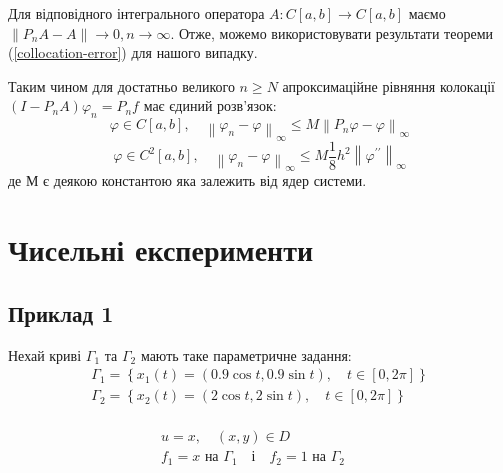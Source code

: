 \documentclass[14pt,a4paper]{extarticle}
\newcounter{e}
\numberwithin{equation}{section}
\numberwithin{figure}{section}
\begin{document}
 Для відповідного інтегрального оператора $A: C[a, b] \rightarrow C[a, b]$ маємо $\left\|P_{n} A-A\right\| \rightarrow 0, n \rightarrow \infty$.
 Отже, можемо використовувати результати теореми (\ref{collocation-error}) для нашого випадку.

 Таким чином для достатньо великого $n \geq N$ апроксимаційне рівняння колокації $\left(I-P_{n} A\right) \varphi_{n}=P_{n} f$ має єдиний розв'язок:
\begin{equation}
	\varphi \in C[a, b], \quad \left\|\varphi_{n}-\varphi\right\|_{\infty} \leq M\left\|P_{n} \varphi-\varphi\right\|_{\infty}
\end{equation}
\begin{equation}
	\varphi \in C^{2}[a, b], \quad \left\|\varphi_{n}-\varphi\right\|_{\infty} \leq M \frac{1}{8} h^{2}\left\|\varphi^{\prime \prime}\right\|_{\infty}
\end{equation}
де М є деякою константою яка залежить від ядер системи.

 \newpage
 \thispagestyle{empty}
 \section{Чисельні експерименти} 
\subsection{Приклад 1}
Нехай криві $\Gamma_{1}$ та $\Gamma_{2}$ мають таке параметричне задання:
\begin{equation}
	\label{ex-curves}
	\begin{array}{l}
		\displaystyle
		\Gamma_{1}=\left\{x_{1}(t)=(0.9 \cos t, 0.9 \sin t), \quad t \in[0,2 
		\pi]\right\} \\
		
		\displaystyle
		\Gamma_{2}=\left\{x_{2}(t)=(2 \cos t, 2 \sin t), \quad  t \in[0,2 \pi]\right\} \\[0.1cm]
	\end{array}
\end{equation}

\begin{equation}
	\begin{array}{cr}
		\label{ex1}
		\displaystyle
		u = x, \quad (x, y) \in D   \\ [0.3cm]
		
		\displaystyle
		f_1 = x  \text { на } \Gamma_{1}
		\quad  \text {і}  \quad
		f_2 = 1  \text { на } \Gamma_{2} \quad
	\end{array}
\end{equation}
\end{document}

